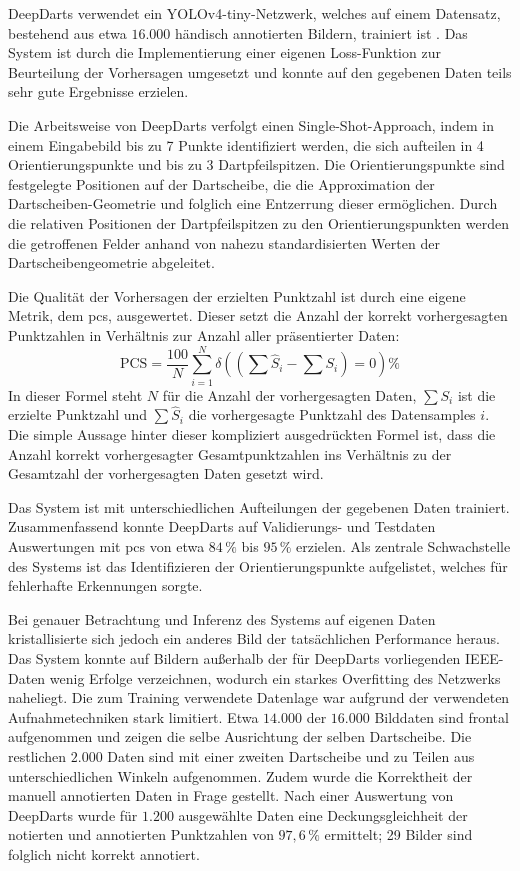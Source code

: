 DeepDarts verwendet ein YOLOv4-tiny-Netzwerk, welches auf einem Datensatz, bestehend aus etwa $16.000$ händisch annotierten Bildern, trainiert ist \cite{deepdarts-data}. Das System ist durch die Implementierung einer eigenen Loss-Funktion zur Beurteilung der Vorhersagen umgesetzt und konnte auf den gegebenen Daten teils sehr gute Ergebnisse erzielen.

Die Arbeitsweise von DeepDarts verfolgt einen Single-Shot-Approach, indem in einem Eingabebild bis zu 7 Punkte identifiziert werden, die sich aufteilen in 4 Orientierungspunkte und bis zu 3 Dartpfeilspitzen. Die Orientierungspunkte sind festgelegte Positionen auf der Dartscheibe, die die Approximation der Dartscheiben-Geometrie und folglich eine Entzerrung dieser ermöglichen. Durch die relativen Positionen der Dartpfeilspitzen zu den Orientierungspunkten werden die getroffenen Felder anhand von nahezu standardisierten Werten der Dartscheibengeometrie abgeleitet.

Die Qualität der Vorhersagen der erzielten Punktzahl ist durch eine eigene Metrik, dem \ac{pcs}, ausgewertet. Dieser setzt die Anzahl der korrekt vorhergesagten Punktzahlen in Verhältnis zur Anzahl aller präsentierter Daten:
\[ \text{PCS} = \frac{100}{N} \sum_{i=1}^{N} \delta \left(\left(\sum \hat{S}_i - \sum S_i\right) = 0\right)\% \]
In dieser Formel steht $N$ für die Anzahl der vorhergesagten Daten, $\sum S_i$ ist die erzielte Punktzahl und $\sum \hat{S}_i$ die vorhergesagte Punktzahl des Datensamples $i$. Die simple Aussage hinter dieser kompliziert ausgedrückten Formel ist, dass die Anzahl korrekt vorhergesagter Gesamtpunktzahlen ins Verhältnis zu der Gesamtzahl der vorhergesagten Daten gesetzt wird.

Das System ist mit unterschiedlichen Aufteilungen der gegebenen Daten trainiert. Zusammenfassend konnte DeepDarts auf Validierungs- und Testdaten Auswertungen mit \ac{pcs} von etwa $84\,\%$ bis $95\,\%$ erzielen. Als zentrale Schwachstelle des Systems ist das Identifizieren der Orientierungspunkte aufgelistet, welches für fehlerhafte Erkennungen sorgte.

Bei genauer Betrachtung und Inferenz des Systems auf eigenen Daten kristallisierte sich jedoch ein anderes Bild der tatsächlichen Performance heraus. Das System konnte auf Bildern außerhalb der für DeepDarts vorliegenden IEEE-Daten wenig Erfolge verzeichnen, wodurch ein starkes Overfitting des Netzwerks naheliegt. Die zum Training verwendete Datenlage war aufgrund der verwendeten Aufnahmetechniken stark limitiert. Etwa $14.000$ der $16.000$ Bilddaten sind frontal aufgenommen und zeigen die selbe Ausrichtung der selben Dartscheibe. Die restlichen $2.000$ Daten sind mit einer zweiten Dartscheibe und zu Teilen aus unterschiedlichen Winkeln aufgenommen. Zudem wurde die Korrektheit der manuell annotierten Daten in Frage gestellt. Nach einer Auswertung von DeepDarts wurde für $1.200$ ausgewählte Daten eine Deckungsgleichheit der notierten und annotierten Punktzahlen von $97,6\,\%$ ermittelt; 29 Bilder sind folglich nicht korrekt annotiert.

